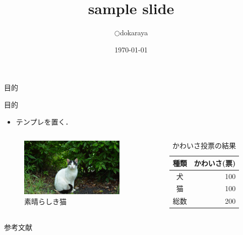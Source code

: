 \documentclass[dvipdfmx]{beamer}
\theoremstyle{example}
\begin{document}
\title[sample]{sample slide}
\author[dokaraya]{$	\bigcirc$dokaraya}
\date{\today}

\begin{frame}
\titlepage
\nocite{*}
\end{frame}

\begin{frame}{目的}
  \begin{block}{目的}
    \begin{itemize}
      \item テンプレを置く．
    \end{itemize}
  \end{block}

  \begin{columns}[t]
  \begin{column}{0.55\textwidth}
    \begin{figure}
      \centering
      \includegraphics[width=5cm]{fig/img.jpg}
      \caption{素晴らしき猫}
      \label{fig:cat}
    \end{figure}
  \end{column}
  \begin{column}{0.45\textwidth}
    \begin{table}[t]
      \caption{かわいさ投票の結果}
      \label{tab:example}
      \centering
      \begin{tabular}{cr}
        \hline
        種類 & かわいさ(票)\\ \hline
        犬 & 100\\
        猫 & 100\\ \hline
        総数 & 200 \\ \hline
      \end{tabular}
    \end{table}
  \end{column}
\end{columns}
\end{frame}

\begin{frame}[allowframebreaks]{参考文献}
    \scriptsize
    \beamertemplatetextbibitems
    
    
\end{frame}
\end{document}
